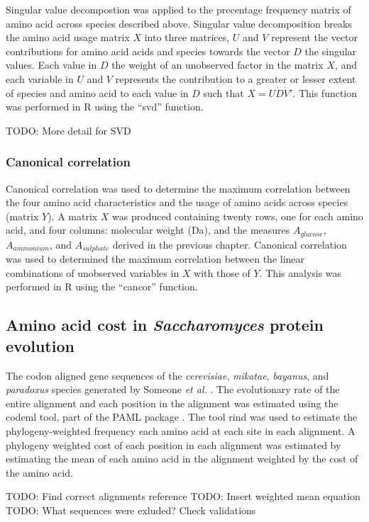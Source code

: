 Singular value decompostion was applied to the precentage frequency matrix of amino acid across species described above. Singular value decomposition breaks the amino acid usage matrix $X$ into three matrices, $U$ and $V$ represent the vector contributions for amino acid acids and species towards the vector $D$ the singular values. Each value in $D$ the weight of an unobserved factor in the matrix $X$, and each variable in $U$ and $V$  represents the contribution to a greater or lesser extent of species and amino acid to each value in $D$ such that $X = U \dot D \dot V'$. This function was performed in R using the ``svd'' function.

TODO: More detail for SVD

\subsubsection{Canonical correlation}

Canonical correlation was used to determine the maximum correlation between the four amino acid characteristics and the usage of amino acids across species (matrix $Y$). A matrix $X$ was produced containing twenty rows, one for each amino acid, and four columns: molecular weight (Da), and the measures $A_{glucose}$, $A_{ammonium}$, and $A_{sulphate}$ derived in the previous chapter. Canonical correlation was used to determined the maximum correlation between the linear combinations of unobserved variables in $X$ with those of $Y$. This analysis was performed in R using the ``cancor'' function.

\subsection{Amino acid cost in \emph{Saccharomyces} protein evolution}

The codon aligned gene sequences of the \emph{cerevisiae}, \emph{mikatae}, \emph{bayanus}, and \emph{paradoxus} species generated by Someone \emph{et al.} \cite{alignments}. The evolutionary rate of the entire alignment and each position in the alignment was estimated using the codeml tool, part of the PAML package \cite{paml}. The tool rind \cite{rind} was used to estimate the phylogeny-weighted frequency each amino acid at each site in each alignment. A phylogeny weighted cost of each position in each alignment was estimated by estimating the mean of each amino acid in the alignment weighted by the cost of the amino acid.

TODO: Find correct alignments reference
TODO: Insert weighted mean equation
TODO: What sequences were exluded? Check validations

